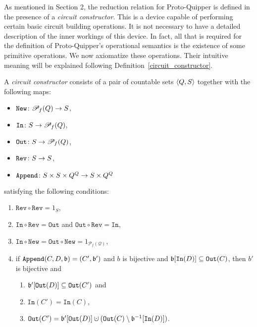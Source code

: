 \documentclass[twoside]{article}
\begin{document}
As mentioned in Section 2, the reduction relation for Proto-Quipper is
defined in the presence of a \emph{circuit constructor}. This is a
device capable of performing certain basic circuit building
operations. It is not necessary to have a detailed description of the
inner workings of this device. In fact, all that is required for the
definition of Proto-Quipper's operational semantics is the existence
of some primitive operations. We now axiomatize these
operations. Their intuitive meaning will be explained following
Definition~\ref{circuit_constructor}.

\begin{definition}
\label{circuit_constructor}
A \emph{circuit constructor} consists of a pair of countable sets $\langle Q,S\rangle$ 
together with the following maps:
\begin{itemize}
  \item $\mathtt{New}\colon {\mathscr{P}}_f(Q) \to S$,
  \item $\mathtt{In}\colon S\to {\mathscr{P}}_f(Q)$,
  \item $\mathtt{Out}\colon S\to {\mathscr{P}}_f(Q)$,
  \item $\mathtt{Rev}\colon S \to S$,
  \item $\mathtt{Append}\colon S\times S\times Q^Q \to S \times Q^Q$
\end{itemize}
satisfying the following conditions:
\begin{enumerate}
  \item $\mathtt{Rev}\circ\mathtt{Rev}=1_S$,
  \item $\mathtt{In}\circ\mathtt{Rev}= \mathtt{Out}$ and 
        $\mathtt{Out}\circ\mathtt{Rev}= \mathtt{In}$\label{in_out_rev},
  \item $\mathtt{In}\circ\mathtt{New} = \mathtt{Out}\circ\mathtt{New} =
    1_{\mathcal{P}_f(\mathcal{Q})}$,
  \item if $\mathtt{Append} (C,D,\mathfrak{b})=(C',\mathfrak{b}')$ and $b$ is
    bijective and $\mathfrak{b}[\mathtt{In}(D)]\subseteq \mathtt{Out}
    (C)$, then $b'$ is bijective and\label{Append_cond_x}
    \begin{enumerate}
      \item $\mathfrak{b}'[\mathtt{Out}(D)]\subseteq\mathtt{Out}(C')$ and\label{Append_cond_2}
      \item $\mathtt{In}(C') = \mathtt{In}(C)$,\label{Append_cond_2b}
      \item $\mathtt{Out}(C')=\binding'[\mathtt{Out}(D)]\cupdot(\mathtt{Out}(C)\setminus\binding^{-1}[\mathtt{In}(D)])$.\label{Append_cond_3}
    \end{enumerate}
\end{enumerate}
\end{definition}
\end{document}
